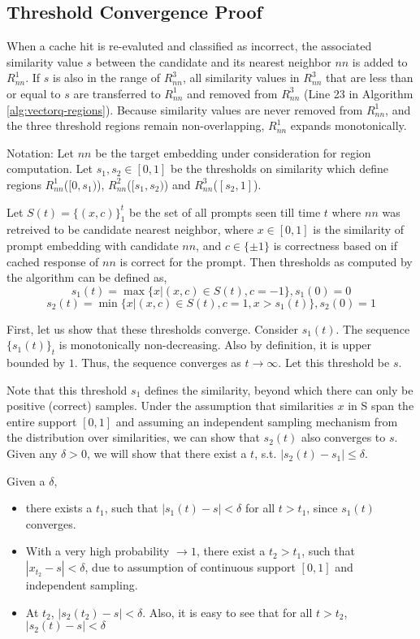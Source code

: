 
\subsection{Threshold Convergence Proof}
\label{threshold-convergence-proof}
When a cache hit is re-evaluted and classified as incorrect, the associated similarity value $s$ between the candidate and its nearest neighbor $nn$ is added to $R_{nn}^1$. If $s$ is also in the range of $R_{nn}^3$, all similarity values in $R_{nn}^3$ that are less than or equal to $s$ are transferred to $R_{nn}^1$ and removed from $R_{nn}^3$ (Line 23 in Algorithm \ref{alg:vectorq-regions}). Because similarity values are never removed from $R_{nn}^1$, and the three threshold regions remain non-overlapping, $R_{nn}^1$ expands monotonically.

Notation: Let $nn$ be the target embedding under consideration for region computation. Let  $s_1, s_2 \in [0,1]$  be the thresholds on similarity which define regions $R_{nn}^1$($[0,s_1)$), $R_{nn}^2$($[s_1, s_2)$) and $R_{nn}^3$($[s_2, 1]$). 

Let $S(t) = \{(x, c)\}_{1}^t$ be the set of all prompts seen till time $t$ where $nn$ was retreived to be candidate nearest neighbor, where $x\in [0,1]$ is the similarity of prompt embedding with candidate $nn$, and $c \in \{\pm 1 \}$ is correctness based on if cached response of $nn$ is correct for the prompt. Then thresholds as computed by the algorithm can be defined as,
\[
    s_1(t) = \max \{ x | (x, c) \in S(t), c = -1\}, s_1(0) = 0
\]
\[
    s_2(t) = \min \{ x | (x, c) \in S(t), c=1, x > s_1(t)\}, s_2(0) = 1
\]

First, let us show that these thresholds converge. Consider $s_1(t)$. The sequence $\{s_1(t)\}_t$ is monotonically non-decreasing. Also by definition, it is upper bounded by $1$. Thus, the sequence converges as $t\rightarrow \infty$. Let this threshold be $s$.

Note that this threshold $s_1$ defines the similarity, beyond which there can only be positive (correct) samples. Under the assumption that similarities $x$ in S span the entire support $[0,1]$ and assuming an independent sampling mechanism from the distribution over similarities, we can show that $s_2(t)$ also converges to $s$. Given any $\delta > 0$, we will show that there exist a $t$, s.t. $|s_2(t) - s_1| \leq \delta.$

Given a $\delta$,
\begin{itemize}
    \item  there exists a $t_1$, such that $| s_1(t) - s | < \delta$ for all $t > t_1$, since $s_1(t)$ converges.
    \item With a very high probability $\rightarrow 1$, there exist a $t_2 > t_1$, such that $|x_{t_2} - s| < \delta$, due to assumption of continuous support $[0,1]$ and independent sampling.
    \item At $t_2$, $| s_2(t_2) - s | < \delta$. Also, it is easy to see that for all $t > t_2$, $| s_2(t) - s | < \delta$
\end{itemize}

